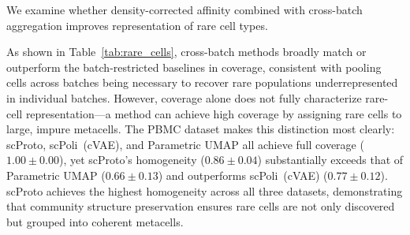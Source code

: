 We examine whether density-corrected affinity combined with cross-batch aggregation improves representation of rare cell types.

As shown in Table~\ref{tab:rare_cells}, cross-batch methods broadly match or outperform the batch-restricted baselines in coverage, consistent with pooling cells across batches being necessary to recover rare populations underrepresented in individual batches.
However, coverage alone does not fully characterize rare-cell representation---a method can achieve high coverage by assigning rare cells to large, impure metacells.
The PBMC dataset makes this distinction most clearly: scProto, scPoli~(cVAE), and Parametric UMAP all achieve full coverage ($1.00 \pm 0.00$), yet scProto's homogeneity ($0.86 \pm 0.04$) substantially exceeds that of Parametric UMAP ($0.66 \pm 0.13$) and outperforms scPoli~(cVAE) ($0.77 \pm 0.12$).
scProto achieves the highest homogeneity across all three datasets, demonstrating that community structure preservation ensures rare cells are not only discovered but grouped into coherent metacells.

